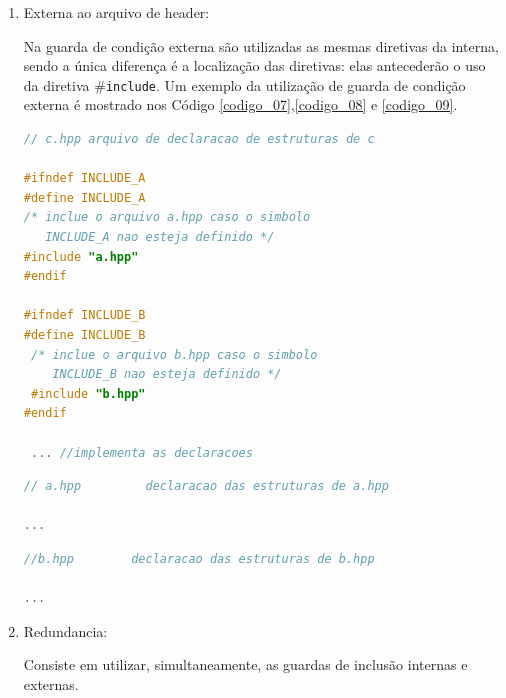 \begin{enumerate}
\item Externa ao arquivo de header:
 
Na  guarda de condição externa  são utilizadas as mesmas diretivas da interna,
 sendo a única diferença é a localização das diretivas: elas antecederão o uso
 da diretiva \#\texttt{include}. Um exemplo da utilização de guarda de condição 
externa é mostrado nos Código \ref{codigo_07},\ref{codigo_08} e
 \ref{codigo_09}\cite{ref42}.


\begin{lstlisting}[language=C++,frame=single,title={Código 7: Arquivo c.hpp 
                                    contendo guardas de inclusão externa 
                                            para os arquivos a.hpp e b.hpp},
                                                            label=codigo_07]
// c.hpp arquivo de declaracao de estruturas de c

#ifndef INCLUDE_A
#define INCLUDE_A
/* inclue o arquivo a.hpp caso o simbolo 
   INCLUDE_A nao esteja definido */
#include "a.hpp"
#endif
        
#ifndef INCLUDE_B
#define INCLUDE_B
 /* inclue o arquivo b.hpp caso o simbolo 
    INCLUDE_B nao esteja definido */
 #include "b.hpp"
#endif

 ... //implementa as declaracoes

\end{lstlisting}

\begin{lstlisting}[language=C++,frame=single,title={Código 8: Arquivo a.hpp 
                                           com guarda de inclusão externa },
                                                            label=codigo_08]
// a.hpp         declaracao das estruturas de a.hpp

...

\end{lstlisting}

\begin{lstlisting}[language=C++,frame=single,title={Código 9: Arquivo b.hpp
                                           com guarda de inclusão externa},
                                                            label=codigo_09]
//b.hpp        declaracao das estruturas de b.hpp

...

\end{lstlisting}


\item Redundancia:

Consiste em utilizar, simultaneamente, as guardas de inclusão internas e 
externas. 


\end{enumerate}
